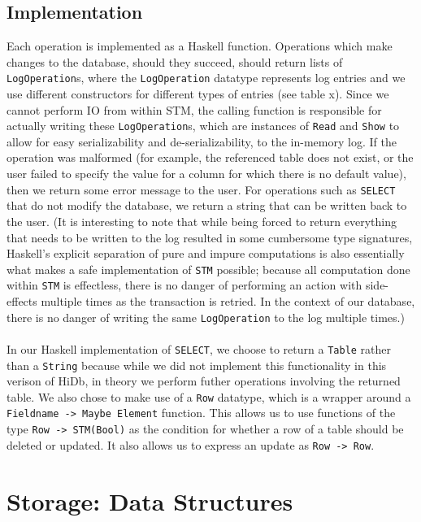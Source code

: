 \documentclass[10pt]{article}
\begin{document}
\begin{multicols}{2}
\subsection{Implementation}
Each operation is implemented as a Haskell function.  Operations which make changes to the database, should they succeed, should return lists of \texttt{LogOperation}s, where the \texttt{LogOperation} datatype represents log entries and we use different constructors for different types of entries (see table x). Since we cannot perform IO from within STM, the calling function is responsible for actually writing these \texttt{LogOperation}s, which are instances of \texttt{Read} and \texttt{Show} to allow for easy serializability and de-serializability, to the in-memory log. If the operation was malformed (for example, the referenced table does not exist, or the user failed to specify the value for a column for which there is no default value), then we return some error message to the user. For operations such as \texttt{SELECT} that do not modify the database, we return a string that can be written back to the user. (It is interesting to note that while being forced to return everything that needs to be written to the log resulted in some cumbersome type signatures, 
Haskell's explicit separation of pure and impure computations is also essentially what makes a safe implementation of \texttt{STM} possible; because all computation done within \texttt{STM} is effectless, there is no danger of performing an action with side-effects multiple times as the transaction is retried. In the context of our database, there is no danger of writing the same \texttt{LogOperation} to the log multiple times.) \\\\
In our Haskell implementation of \texttt{SELECT}, we choose to return a \texttt{Table} rather than a \texttt{String} because while we did not implement this functionality in this verison of HiDb, in theory we perform futher operations involving the returned table. We also chose to make use of a \texttt{Row} datatype, which is a wrapper around a \texttt{Fieldname -> Maybe Element} function. This allows us to use functions of the type \texttt{Row -> STM(Bool)} as the condition for whether a row of a table should be deleted or updated. It also allows us to express an update as \texttt{Row -> Row}. 

\section{Storage: Data Structures}


\end{multicols}
\end{document}
